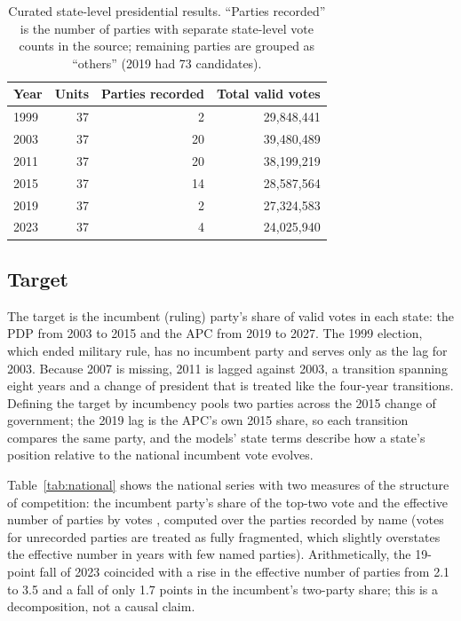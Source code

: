 \documentclass[preprint,12pt,authoryear]{elsarticle}
\begin{document}
\begin{table}[ht]
\centering
\caption{Curated state-level presidential results. ``Parties recorded'' is the number of parties with separate state-level vote counts in the source; remaining parties are grouped as ``others'' (2019 had 73 candidates).}
\label{tab:election_results}
\begin{tabular}{lrrr}
\toprule
Year & Units & Parties recorded & Total valid votes \\
\midrule
1999 & 37 & 2 & 29,848,441 \\
2003 & 37 & 20 & 39,480,489 \\
2011 & 37 & 20 & 38,199,219 \\
2015 & 37 & 14 & 28,587,564 \\
2019 & 37 & 2 & 27,324,583 \\
2023 & 37 & 4 & 24,025,940 \\
\bottomrule
\end{tabular}
\end{table}

\subsection{Target}
The target is the incumbent (ruling) party's share of valid votes in each state: the PDP from 2003 to 2015 and the APC from 2019 to 2027. The 1999 election, which ended military rule, has no incumbent party and serves only as the lag for 2003. Because 2007 is missing, 2011 is lagged against 2003, a transition spanning eight years and a change of president that is treated like the four-year transitions. Defining the target by incumbency pools two parties across the 2015 change of government; the 2019 lag is the APC's own 2015 share, so each transition compares the same party, and the models' state terms describe how a state's position relative to the national incumbent vote evolves.

Table~\ref{tab:national} shows the national series with two measures of the structure of competition: the incumbent party's share of the top-two vote and the effective number of parties by votes \citep{Laakso1979ENP}, computed over the parties recorded by name (votes for unrecorded parties are treated as fully fragmented, which slightly overstates the effective number in years with few named parties). Arithmetically, the 19-point fall of 2023 coincided with a rise in the effective number of parties from 2.1 to 3.5 and a fall of only 1.7 points in the incumbent's two-party share; this is a decomposition, not a causal claim.
\end{document}
